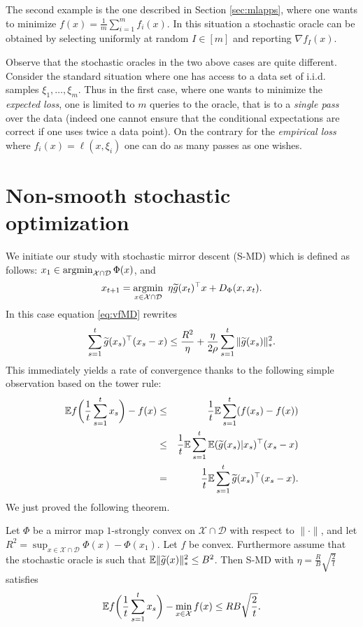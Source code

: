 The second example is the one described in Section \ref{sec:mlapps}, where one wants to minimize $f(x) = \frac{1}{m} \sum_{i=1}^m f_i(x)$. In this situation a stochastic oracle can be obtained by selecting uniformly at random $I \in [m]$ and reporting $\nabla f_I(x)$.

Observe that the stochastic oracles in the two above cases are quite different. Consider the standard situation where one has access to a data set of i.i.d. samples $\xi_1, \hdots, \xi_m$. Thus in the first case, where one wants to minimize the {\em expected loss}, one is limited to $m$ queries to the oracle, that is to a {\em single pass} over the data (indeed one cannot ensure that the conditional expectations are correct if one uses twice a data point). On the contrary for the {\em empirical loss} where $f_i(x) = \ell(x, \xi_i)$ one can do as many passes as one wishes.

\section{Non-smooth stochastic optimization} \label{sec:smd}
We initiate our study with stochastic mirror descent (S-MD) which is defined as follows: $x_1 \in \mathop{\mathrm{argmin}}_{\mathcal{X} \cap \mathcal{D}} \Phi(x)$, and
$$x_{t+1} = \mathop{\mathrm{argmin}}_{x \in \mathcal{X} \cap \mathcal{D}} \ \eta \widetilde{g}(x_t)^{\top} x + D_{\Phi}(x,x_t) .$$
In this case equation \eqref{eq:vfMD} rewrites
$$\sum_{s=1}^t \widetilde{g}(x_s)^{\top} (x_s - x) \leq \frac{R^2}{\eta} + \frac{\eta}{2 \rho} \sum_{s=1}^t \|\widetilde{g}(x_s)\|_*^2 .$$
This immediately yields a rate of convergence thanks to the following simple observation based on the tower rule:
\begin{eqnarray*}
\mathbb{E} f\bigg(\frac{1}{t} \sum_{s=1}^t x_s \bigg) - f(x) & \leq & \frac{1}{t} \mathbb{E} \sum_{s=1}^t (f(x_s) - f(x)) \\
& \leq & \frac{1}{t} \mathbb{E} \sum_{s=1}^t \mathbb{E}(\widetilde{g}(x_s) | x_s)^{\top} (x_s - x) \\
& = & \frac{1}{t} \mathbb{E} \sum_{s=1}^t \widetilde{g}(x_s)^{\top} (x_s - x) .
\end{eqnarray*}
We just proved the following theorem.
\begin{theorem} \label{th:SMD}
Let $\Phi$ be a mirror map $1$-strongly convex on $\mathcal{X} \cap \mathcal{D}$ with respect to $\|\cdot\|$, and
let $R^2 = \sup_{x \in \mathcal{X} \cap \mathcal{D}} \Phi(x) - \Phi(x_1)$. Let $f$ be convex. Furthermore assume that the stochastic oracle is such that $\mathbb{E} \|\widetilde{g}(x)\|_*^2 \leq B^2$. Then S-MD with $\eta = \frac{R}{B} \sqrt{\frac{2}{t}}$ satisfies
$$\mathbb{E} f\bigg(\frac{1}{t} \sum_{s=1}^t x_s \bigg) - \min_{x \in \mathcal{X}} f(x) \leq R B \sqrt{\frac{2}{t}} .$$
\end{theorem}

